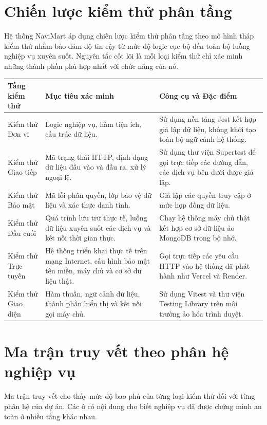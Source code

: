 \documentclass[../main.tex]{subfiles}
\begin{document}
\section{Chiến lược kiểm thử phân tầng}
Hệ thống NaviMart áp dụng chiến lược kiểm thử phân tầng theo mô hình tháp kiểm thử nhằm bảo đảm độ tin cậy từ mức độ logic cục bộ đến toàn bộ luồng nghiệp vụ xuyên suốt. Nguyên tắc cốt lõi là mỗi loại kiểm thử chỉ xác minh những thành phần phù hợp nhất với chức năng của nó.

\begin{longtable}{|p{}|p{}|p{}|}
\hline
\textbf{Tầng kiểm thử} & \textbf{Mục tiêu xác minh} & \textbf{Công cụ và Đặc điểm} \\
\hline
Kiểm thử Đơn vị & Logic nghiệp vụ, hàm tiện ích, cấu trúc dữ liệu. & Sử dụng nền tảng Jest kết hợp giả lập dữ liệu, không khởi tạo toàn bộ ngữ cảnh hệ thống. \\
\hline
Kiểm thử Giao tiếp & Mã trạng thái HTTP, định dạng dữ liệu đầu vào và đầu ra, xử lý ngoại lệ. & Sử dụng thư viện Supertest để gọi trực tiếp các đường dẫn, các dịch vụ bên dưới được giả lập. \\
\hline
Kiểm thử Bảo mật & Mã lỗi phân quyền, lớp bảo vệ dữ liệu và xác thực danh tính. & Giả lập các quyền truy cập ở mức hợp đồng dữ liệu. \\
\hline
Kiểm thử Đầu cuối & Quá trình lưu trữ thực tế, luồng dữ liệu xuyên suốt các dịch vụ và kết nối thời gian thực. & Chạy hệ thống máy chủ thật kết hợp cơ sở dữ liệu ảo MongoDB trong bộ nhớ. \\
\hline
Kiểm thử Trực tuyến & Hệ thống triển khai thực tế trên mạng Internet, cấu hình bảo mật tên miền, máy chủ và cơ sở dữ liệu thật. & Gọi trực tiếp các yêu cầu HTTP vào hệ thống đã phát hành như Vercel và Render. \\
\hline
Kiểm thử Giao diện & Hàm thuần, ngữ cảnh dữ liệu, thành phần hiển thị và kết nối gọi máy chủ. & Sử dụng Vitest và thư viện Testing Library trên môi trường ảo hóa trình duyệt. \\
\hline
\end{longtable}

\section{Ma trận truy vết theo phân hệ nghiệp vụ}
Ma trận truy vết cho thấy mức độ bao phủ của từng loại kiểm thử đối với từng phân hệ của dự án. Các ô có nội dung cho biết nghiệp vụ đã được chứng minh an toàn ở nhiều tầng khác nhau.
\end{document}

